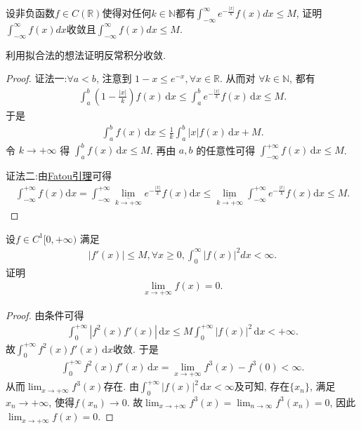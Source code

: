 \documentclass[../../main.tex]{subfiles}
\begin{document}
\begin{example}
设非负函数$f \in C(\mathbb{R})$使得对任何$k \in \mathbb{N}$都有$\int_{-\infty}^{\infty} e^{-\frac{|x|}{k}} f(x) dx \leqslant M$, 证明$\int_{-\infty}^{\infty} f(x) dx$收敛且$\int_{-\infty}^{\infty} f(x) dx \leqslant M$.
\end{example}
\begin{note}
利用拟合法的想法证明反常积分收敛.
\end{note}
\begin{proof}
{\color{blue} 证法一:}$\forall a < b$, 注意到 $1 - x \leqslant e^{-x}, \forall x \in \mathbb{R}$. 从而对 $\forall k \in \mathbb{N}$, 都有
\begin{align*}
\int_a^b \left( 1 - \frac{|x|}{k} \right) f(x) \, \mathrm{d}x \leqslant \int_a^b e^{-\frac{|x|}{k}} f(x) \, \mathrm{d}x \leqslant M.
\end{align*}
于是
\begin{align*}
\int_a^b f(x) \, \mathrm{d}x \leqslant \frac{1}{k} \int_a^b |x| f(x) \, \mathrm{d}x + M.
\end{align*}
令 $k \to +\infty$ 得 $\int_a^b f(x) \, \mathrm{d}x \leqslant M$. 再由 $a, b$ 的任意性可得 $\int_{-\infty}^{+\infty} f(x) \, \mathrm{d}x \leqslant M$.

{\color{blue} 证法二:}由\hyperref[Real Analysis-lemma:Fatou引理]{Fatou引理}可得
\begin{align*}
\int_{-\infty}^{+\infty}{f\left( x \right) \mathrm{d}x}=\int_{-\infty}^{+\infty}{\underset{k\rightarrow +\infty}{\underline{\lim }}e^{-\frac{\left| x \right|}{k}}f\left( x \right) \mathrm{d}x}\leqslant \underset{k\rightarrow +\infty}{\underline{\lim }}\int_{-\infty}^{+\infty}{e^{-\frac{\left| x \right|}{k}}f\left( x \right) \mathrm{d}x}\leqslant M.
\end{align*}
\end{proof}

\begin{example}
设$f \in C^1[0, +\infty)$ 满足
\begin{align*}
|f'(x)| \leqslant M, \forall x \geqslant 0, \int_0^{\infty} |f(x)|^2 dx < \infty.
\end{align*}
证明
\begin{align*}
\lim_{x \to +\infty} f(x) = 0.
\end{align*}
\end{example}
\begin{proof}
由条件可得
\begin{align*}
\int_0^{+\infty} \left| f^2(x) f'(x) \right| \, \mathrm{d}x \leqslant M \int_0^{+\infty} \left| f(x) \right|^2 \, \mathrm{d}x < +\infty.
\end{align*}
故$\int_0^{+\infty} f^2(x) f'(x) \, \mathrm{d}x$收敛. 于是
\begin{align*}
\int_0^{+\infty} f^2(x) f'(x) \, \mathrm{d}x = \lim_{x \to +\infty} f^3(x) - f^3(0) < \infty.
\end{align*}
从而$\lim_{x \to +\infty} f^3(x)$存在. 由$\int_0^{+\infty} \left| f(x) \right|^2 \, \mathrm{d}x < \infty$及可知, 存在$\{x_n\}$, 满足$x_n \to +\infty$, 使得$f(x_n) \to 0$.
故$\lim_{x \to +\infty} f^3(x) = \lim_{n \to \infty} f^3(x_n) = 0$, 因此$\lim_{x \to +\infty} f(x) = 0$.
\end{proof}
\end{document}
